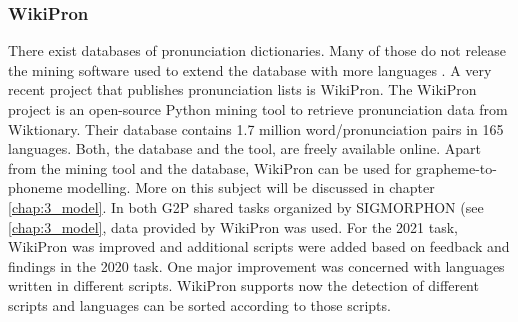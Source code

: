 \subsubsection*{WikiPron}
There exist databases of pronunciation dictionaries. Many of those do not release the mining software used to extend the database with more languages \citep{Lee&Ashby.2020}. A very recent project that publishes pronunciation lists is WikiPron. The WikiPron project \citep{Lee&Ashby.2020} is an open-source Python mining tool to retrieve pronunciation data from Wiktionary. Their database contains 1.7 million word/pronunciation pairs in 165 languages. Both, the database and the tool, are freely available online. Apart from the mining tool and the database, WikiPron can be used for grapheme-to-phoneme modelling. More on this subject will be discussed in chapter \ref{chap:3_model}.
In both G2P shared tasks organized by SIGMORPHON (see \ref{chap:3_model}, data provided by WikiPron was used. For the 2021 task, WikiPron was improved and additional scripts were added based on feedback and findings in the 2020 task. One major improvement was concerned with languages written in different scripts. WikiPron supports now the detection of different scripts and languages can be sorted according to those scripts.

 


 	